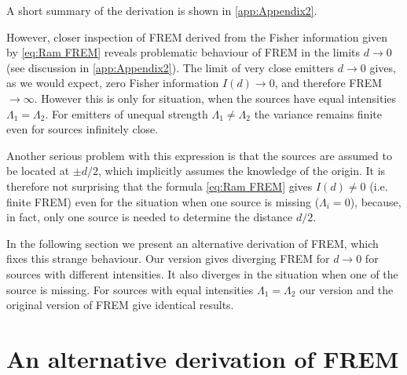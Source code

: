 A short summary of the derivation is shown in \autoref{app:Appendix2}. 

However, closer inspection of FREM derived from the Fisher information given by \autoref{eq:Ram FREM} reveals problematic behaviour of FREM in the limits $d\rightarrow 0$ (see discussion in \autoref{app:Appendix2}). The limit of very close emitters $d\rightarrow0$ gives, as we would expect, zero Fisher information $I(d)\rightarrow0$, and therefore FREM$\rightarrow\infty$. However this is only for situation, when the sources have equal intensities $\Lambda_1=\Lambda_2$. For emitters of unequal strength $\Lambda_1\neq\Lambda_2$ the variance remains finite even for sources infinitely close. 

Another serious problem with this expression is that the sources are assumed to be located at $\pm d/2$, which implicitly assumes the knowledge of the origin. It is therefore not surprising that the formula \autoref{eq:Ram FREM} gives $I(d)\neq0$ (i.e. finite FREM) even for the situation when one source is missing ($\Lambda_i=0$), because, in fact, only one source is needed to determine the distance $d/2$. 

In the following section we present an alternative derivation of FREM, which fixes this strange behaviour. Our version gives diverging FREM for $d\rightarrow0$ for sources with different intensities. It also diverges in the situation when one of the source is missing. For sources with equal intensities $\Lambda_1=\Lambda_2$ our version and the original version of FREM give identical results. 


\section{An alternative derivation of FREM\label{sub:An-alternative-derivation-FREM}} 
 
